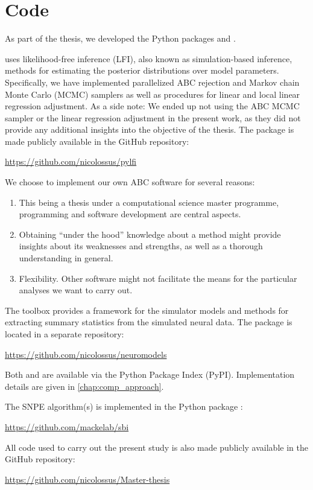 \section{Code}

As part of the thesis, we developed the Python packages  and .

 uses likelihood-free inference (LFI), also known as simulation-based inference, methods for estimating the posterior distributions over model parameters. Specifically, we have implemented parallelized ABC rejection and Markov chain Monte Carlo (MCMC) samplers as well as procedures for linear and local linear regression adjustment. As a side note: We ended up not using the ABC MCMC sampler or the linear regression adjustment in the present work, as they did not provide any additional insights into the objective of the thesis. The package is made publicly available in the GitHub repository:

\begin{center}
    \url{https://github.com/nicolossus/pylfi}
\end{center}

We choose to implement our own ABC software for several reasons: 
\begin{enumerate}
    \item This being a thesis under a computational science master programme, programming and software development are central aspects. 
    \item Obtaining “under the hood” knowledge about a method might provide insights about its weaknesses and strengths, as well as a thorough understanding in general. 
    \item Flexibility. Other software might not facilitate the means for the particular analyses we want to carry out. 
\end{enumerate}

The  toolbox provides a framework for the simulator models and methods for extracting summary statistics from the simulated neural data. The package is located in a separate repository:

\begin{center}
    \url{https://github.com/nicolossus/neuromodels}
\end{center}

Both  and  are available via the Python Package Index (PyPI). Implementation details are given in \autoref{chap:comp_approach}.

The SNPE algorithm(s) is implemented in the  Python package \cite{sbi}: 

\begin{center}
    \url{https://github.com/mackelab/sbi}
\end{center}

All code used to carry out the present study is also made publicly available in the GitHub repository:

\begin{center}
    \url{https://github.com/nicolossus/Master-thesis}
\end{center}
